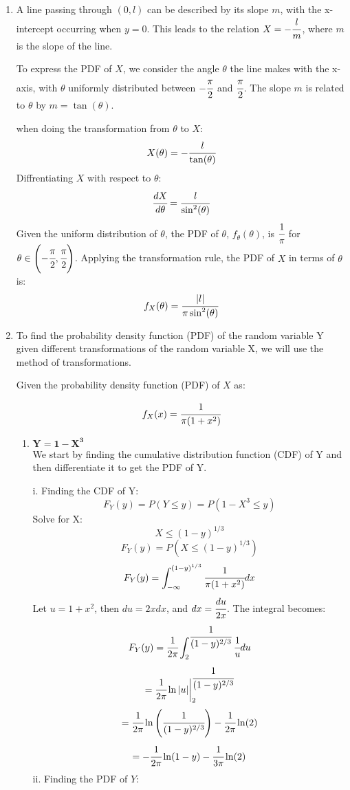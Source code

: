 \documentclass{article}
\begin{document}
\begin{enumerate}
\newpage
\item
    A line passing through \((0, l)\) can be described by its slope \(m\), with the x-intercept occurring when \(y = 0\). This leads to the relation \(X = -\cfrac{l}{m}\), where \(m\) is the slope of the line.

    To express the PDF of \(X\), we consider the angle \(\theta\) the line makes with the x-axis, with \(\theta\) uniformly distributed between \(-\cfrac{\pi}{2}\) and \(\cfrac{\pi}{2}\). The slope \(m\) is related to \(\theta\) by \(m = \tan(\theta)\).

    when doing the transformation from \(\theta\) to \(X\):
    \[
        X(\theta) = -\cfrac{l}{\tan(\theta)}
    \]
    Diffrentiating \(X\) with respect to \(\theta\):
    \[
        \cfrac{dX}{d\theta} = \cfrac{l}{\sin^2(\theta)}
    \]
    Given the uniform distribution of \(\theta\), the PDF of \(\theta\), \(f_\theta(\theta)\), is \(\cfrac{1}{\pi}\) for \(\theta \in \left(-\cfrac{\pi}{2}, \cfrac{\pi}{2}\right)\). Applying the transformation rule, the PDF of \(X\) in terms of \(\theta\) is:
    \[
        f_X(\theta) = \cfrac{|l|}{\pi \sin^2(\theta)}
    \]
    
\newpage
\item
    To find the probability density function (PDF) of the random variable Y given different transformations of the random variable X, we will use the method of transformations.

    Given the probability density function (PDF) of \( X \) as:

    \[ 
        f_X(x) = \cfrac{1}{\pi(1 + x^2)}
    \]
    \begin{enumerate}
        \item 
        \( \mathbf{Y = 1 - X^3}\)\\
        We start by finding the cumulative distribution function (CDF) of Y and then differentiate it to get the PDF of Y.

        i. Finding the CDF of Y:
        \[ 
            F_Y(y) = P(Y \leq y) = P(1 - X^3 \leq y) 
        \]
        Solve for X:
        \[ 
            X \leq (1 - y)^{1/3} 
        \]
        \[ 
            F_Y(y) = P(X \leq (1 - y)^{1/3}) 
        \]
        \[
            F_Y(y) = \int_{-\infty}^{(1 - y)^{1/3}} \cfrac{1}{\pi(1 + x^2)} dx
        \]
        Let $ u = 1 + x^2 $, then $ du = 2x dx $, and $ dx = \cfrac{du}{2x} $.
        The integral becomes:
        \[
            F_Y(y) = \cfrac{1}{2\pi} \int_{2}^{\cfrac{1}{(1 - y)^{2/3}}} \cfrac{1}{u} du
        \]
        \[
            = \cfrac{1}{2\pi} \ln|u| \bigg|_{2}^{\cfrac{1}{(1 - y)^{2/3}}}
        \]
        \[
            = \cfrac{1}{2\pi} \ln\left(\cfrac{1}{(1 - y)^{2/3}}\right) - \cfrac{1}{2\pi} \ln(2)
        \]
        \[
            = -\cfrac{1}{2\pi} \ln(1 - y) - \cfrac{1}{3\pi} \ln(2)
        \]
        ii. Finding the PDF of $Y$:


\end{enumerate}
\end{enumerate}
\end{document}
